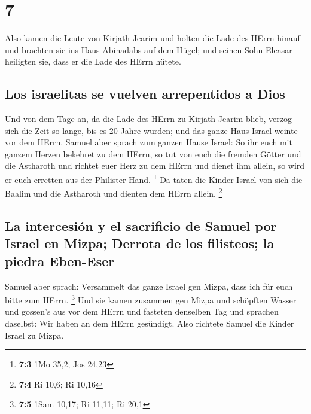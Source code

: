 \hypertarget{section-6}{%
\section{7}\label{section-6}}

 Also kamen die Leute von Kirjath-Jearim und holten die
Lade des HErrn hinauf und brachten sie ins Haus Abinadabs auf dem Hügel;
und seinen Sohn Eleasar heiligten sie, dass er die Lade des HErrn
hütete.

\hypertarget{los-israelitas-se-vuelven-arrepentidos-a-dios}{%
\subsection{Los israelitas se vuelven arrepentidos a
Dios}\label{los-israelitas-se-vuelven-arrepentidos-a-dios}}

 Und von dem Tage an, da die Lade des HErrn zu
Kirjath-Jearim blieb, verzog sich die Zeit so lange, bis es 20 Jahre
wurden; und das ganze Haus Israel weinte vor dem HErrn. 
Samuel aber sprach zum ganzen Hause Israel: So ihr euch mit ganzem
Herzen bekehret zu dem HErrn, so tut von euch die fremden Götter und die
Astharoth und richtet euer Herz zu dem HErrn und dienet ihm allein, so
wird er euch erretten aus der Philister Hand. \footnote{\textbf{7:3} 1Mo
  35,2; Jos 24,23}  Da taten die Kinder Israel von sich
die Baalim und die Astharoth und dienten dem HErrn allein. \footnote{\textbf{7:4}
  Ri 10,6; Ri 10,16}

\hypertarget{la-intercesiuxf3n-y-el-sacrificio-de-samuel-por-israel-en-mizpa-derrota-de-los-filisteos-la-piedra-eben-eser}{%
\subsection{La intercesión y el sacrificio de Samuel por Israel en
Mizpa; Derrota de los filisteos; la piedra
Eben-Eser}\label{la-intercesiuxf3n-y-el-sacrificio-de-samuel-por-israel-en-mizpa-derrota-de-los-filisteos-la-piedra-eben-eser}}

 Samuel aber sprach: Versammelt das ganze Israel gen
Mizpa, dass ich für euch bitte zum HErrn. \footnote{\textbf{7:5} 1Sam
  10,17; Ri 11,11; Ri 20,1}  Und sie kamen zusammen gen
Mizpa und schöpften Wasser und gossen's aus vor dem HErrn und fasteten
denselben Tag und sprachen daselbst: Wir haben an dem HErrn gesündigt.
Also richtete Samuel die Kinder Israel zu Mizpa.

